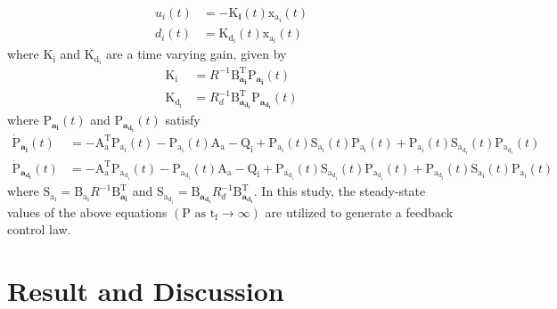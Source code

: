 \documentclass[3p,times]{elsarticle}
\begin{document}
\begin{align}
		{{u_i}}(t) &= -\boldsymbol{{\mathrm{K}}_{i}}(t) \boldsymbol{{\mathrm{x_{a_i}}}}(t)\\
	{{d_i}}(t) &=\boldsymbol{{\mathrm{K_{d_i}}}}(t)\boldsymbol{{\mathrm{x_{a_i}}}}(t)
\end{align}
where $\boldsymbol{{\mathrm{K_i}}}$ and $\boldsymbol{{\mathrm{K_{d_i}}}}$ are a time varying gain, given by
\begin{align}
	\boldsymbol{{\mathrm{K_i}}} &= {{{R}}^{-1}}\boldsymbol{{\mathrm{B}_{a_i}^\mathrm{T}}}\boldsymbol{{\mathrm{P}}_{a_i}}(t)\\
	\boldsymbol{{\mathrm{K_{d_i}}}} &= {{{R}}^{-1}_{d}}\boldsymbol{{\mathrm{B}_{a_{d_i}}^\mathrm{T}}}\boldsymbol{{\mathrm{P}}_{a_{d_i}}}(t)
\end{align}
where $\boldsymbol{{\mathrm{P}}_{a_i}}(t)$ and $\boldsymbol{{\mathrm{P}}_{a_{d_i}}}(t)$ satisfy
\begin{align}\label{coupled_riccatti_LQIDG}
            \boldsymbol{\dot{\mathrm{P}}_{a_i}}(t) &= -\boldsymbol{\mathrm{A^\mathrm{T}_a}}\boldsymbol{\mathrm{P_{a_i}}}(t) - \boldsymbol{\mathrm{P_{a_i}}}(t)\boldsymbol{\mathrm{A_a}} - \boldsymbol{\mathrm{Q_i}} +\boldsymbol{\mathrm{P_{a_i}}}(t)\boldsymbol{\mathrm{S_{a_i}}}(t)\boldsymbol{\mathrm{P_{a_i}}}(t) + \boldsymbol{\mathrm{P_{a_i}}}(t)\boldsymbol{\mathrm{S_{a_{d_i}}}}(t)\boldsymbol{\mathrm{P_{a_{d_i}}}}(t)\\
            \boldsymbol{\dot{\mathrm{P}}_{a_{d_i}}}(t) &= -\boldsymbol{\mathrm{A^\mathrm{T}_a}}\boldsymbol{\mathrm{P_{a_{d_i}}}}(t) - \boldsymbol{\mathrm{P_{a_{d_i}}}}(t)\boldsymbol{\mathrm{A_a}} - \boldsymbol{\mathrm{Q_{i}}} +\boldsymbol{\mathrm{P_{a_{d_i}}}}(t)\boldsymbol{\mathrm{S_{a_{d_i}}}}(t)\boldsymbol{\mathrm{P_{a_{d_i}}}}(t) + \boldsymbol{\mathrm{P_{a_{d_i}}}}(t)\boldsymbol{\mathrm{S_{a_i}}}(t)\boldsymbol{\mathrm{P_{a_i}}}(t)
\end{align}
where $\boldsymbol{\mathrm{S_{a_i}}} = \boldsymbol{\mathrm{B_{a_i}}}R^{-1}\boldsymbol{\mathrm{B}^\mathrm{T}_{a_i}}$ and $\boldsymbol{\mathrm{S_{a_{d_i}}}} = \boldsymbol{\mathrm{B}_{a_{d_i}}}R_{d}^{-1}\boldsymbol{\mathrm{B}^\mathrm{T}_{a_{d_i}}}$.
In this study, the steady-state values of the above equations $(\boldsymbol{{\mathrm{P}}} \text{ as } \mathrm{t_f} \to \infty)$ are utilized to generate a feedback control law.

\section{Result and Discussion}\label{sec:results}
\end{document}
